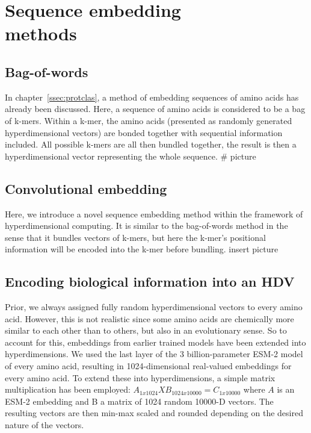 \chapter[Sequence embedding methods]{Sequence embedding\\methods}

\section{Bag-of-words}
In chapter~\ref{ssec:protclas}, a method of embedding sequences of amino acids has already been discussed. Here, a sequence of amino acids is considered to be a bag of k-mers. Within a k-mer, the amino acids (presented as randomly generated hyperdimensional vectors) are bonded together with sequential information included. All possible k-mers are all then bundled together, the result is then a hyperdimensional vector representing the whole sequence.
\# picture

\section{Convolutional embedding}
Here, we introduce a novel sequence embedding method within the framework of hyperdimensional computing. It is similar to the bag-of-words method in the sense that it bundles vectors of k-mers, but here the k-mer's positional information will be encoded into the k-mer before bundling. insert picture

\section{Encoding biological information into an HDV}
Prior, we always assigned fully random hyperdimensional vectors to every amino acid. However, this is not realistic since some amino acids are chemically more similar to each other than to others, but also in an evolutionary sense. So to account for this, embeddings from earlier trained models have been extended into hyperdimensions. We used the last layer of the 3 billion-parameter ESM-2 model~\cite{esm2} of every amino acid, resulting in 1024-dimensional real-valued embeddings for every amino acid. To extend these into hyperdimensions, a simple matrix multiplication has been employed: $A_{1x1024}X B_{1024x10000} = C_{1x10000}$ where $A$ is an ESM-2 embedding and B a matrix of 1024 random 10000-D vectors. The resulting vectors are then min-max scaled and rounded depending on the desired nature of the vectors.
